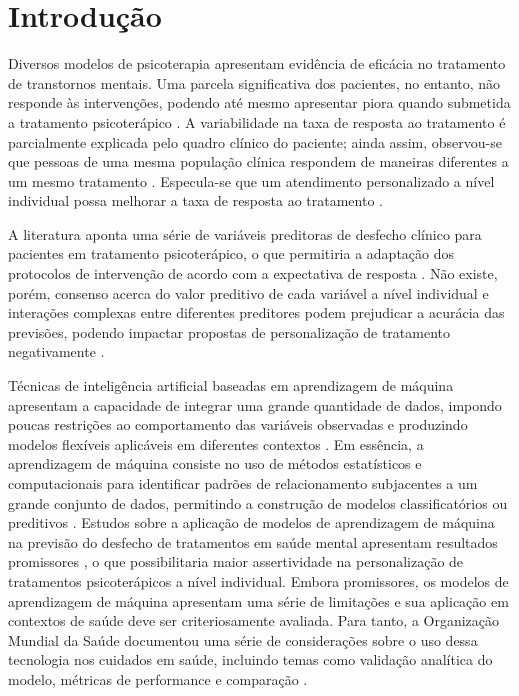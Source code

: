 \section{Introdução}

Diversos modelos de psicoterapia apresentam evidência de eficácia no tratamento de transtornos mentais. Uma parcela significativa dos pacientes,
no entanto, não responde às intervenções, podendo até mesmo apresentar piora quando submetida a tratamento psicoterápico \cite{Cuijpers2021}. A
variabilidade na taxa de resposta ao tratamento é parcialmente explicada pelo quadro clínico do paciente; ainda assim, observou-se que pessoas
de uma mesma população clínica respondem de maneiras diferentes a um mesmo tratamento \cite{Hofmann2012}. Especula-se que um atendimento personalizado
a nível individual possa melhorar a taxa de resposta ao tratamento \cite{Norcross2010, Norcross2018}.

A literatura aponta uma série de variáveis preditoras de desfecho clínico para pacientes em tratamento psicoterápico, o que permitiria a adaptação
dos protocolos de intervenção de acordo com a expectativa de resposta \cite{Smagula2019, Andover2020}. Não existe, porém, consenso acerca do valor
preditivo de cada variável a nível individual e interações complexas entre diferentes preditores podem prejudicar a acurácia das previsões, podendo
impactar propostas de personalização de tratamento negativamente \cite{Taubitz2022}.

Técnicas de inteligência artificial baseadas em aprendizagem de máquina apresentam a capacidade de integrar uma grande quantidade de dados, impondo
poucas restrições ao comportamento das variáveis observadas e produzindo modelos flexíveis aplicáveis em diferentes contextos \cite{Dwyer2018}. Em essência,
a aprendizagem de máquina consiste no uso de métodos estatísticos e computacionais para identificar padrões de relacionamento subjacentes a um grande conjunto
de dados, permitindo a construção de modelos classificatórios ou preditivos \cite{Roth2018}. Estudos sobre a aplicação de modelos de aprendizagem de máquina na
previsão do desfecho de tratamentos em saúde mental apresentam resultados promissores \cite{Dwyer2018}, o que possibilitaria maior assertividade na personalização
de tratamentos psicoterápicos a nível individual. Embora promissores, os modelos de aprendizagem de máquina apresentam uma série de limitações e sua aplicação
em contextos de saúde deve ser criteriosamente avaliada. Para tanto, a Organização Mundial da Saúde documentou uma série de considerações sobre o uso dessa tecnologia
nos cuidados em saúde, incluindo temas como validação analítica do modelo, métricas de performance e comparação \cite{WHO2023}.


